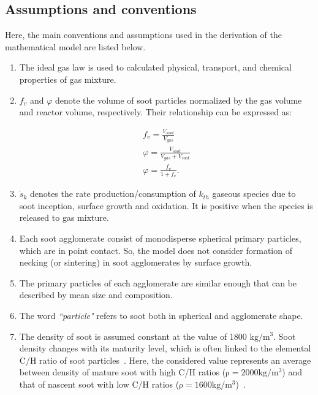 \subsection{Assumptions and conventions}
Here, the main conventions and assumptions used in the derivation of the mathematical model are listed below.

\begin{enumerate}
\item The ideal gas law is used to calculated physical, transport, and chemical properties of gas mixture.

\item $f_v$ and $\varphi$ denote the volume of soot particles normalized by the gas volume and reactor volume, respectively. Their relationship can be expressed as:

\begin{equation}
	\begin{split}
		f_v = \frac{V_{soot}}{V_{gas}} \\
		\varphi = \frac{V_{soot}}{V_{gas} + V_{soot}} \\
		\varphi = \frac{f_v}{1 + f_v}
		\label{eqn:dp_min}.
	\end{split}
\end{equation}

\item ${\dot{s}_k}$ denotes the rate production/consumption of $k_{th}$ gaseous species due to soot inception, surface growth and oxidation. It is positive when the species is released to gas mixture.

\item Each soot agglomerate consist of monodisperse spherical primary particles, which are in point contact. So, the model does not consider formation of necking (or sintering) in soot agglomerates by surface growth.

\item The primary particles of each agglomerate are similar enough that can be described by mean size and composition.

\item The word \textit{``particle"} refers to soot both in spherical and agglomerate shape. 

\item The density of soot is assumed constant at the value of 1800 $\mathrm{kg/m^3}$. Soot density changes with its maturity level, which is often linked to the elemental C/H ratio of soot particles~\citep{michelsen2021effects}. Here, the considered value represents an average between density of mature soot with high C/H ratios ($\mathrm{\rho=2000 kg/m^3}$) and that of nascent soot with low C/H ratios ($\mathrm{\rho=1600 kg/m^3}$)~\citep{jensen2007measurement, michelsen2021effects}.


\end{enumerate}
